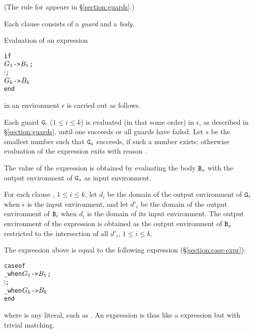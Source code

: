 \SYNTAX

\begin{rules}
       {  }

       { \OR
         \TXT{;} }

       { }

       {\TXT{->} }
\end{rules}
(The rule for  appears in \S\ref{section:guards}.)

Each clause consists of a \emph{guard} and a \emph{body}.

\EVALUATION

Evaluation of an expression
\begin{alltt}
if
    \(\Z{G}\sb{1}\) -> \(\Z{B}\sb{1}\) ;
    \(\vdots\) ;
    \(\Z{G}\sb{k}\) -> \(\Z{B}\sb{k}\)
end
\end{alltt}
in an environment $\epsilon$ is carried out as follows.

Each guard ${\tt{\sl G}}_i$ ($1\leq i\leq k$) is evaluated
(in \ifStd that \fi \ifOld some \fi order)
in $\epsilon$, as described in \S\ref{section:guards}, until one
succeeds or all guards have failed.
Let $s$ be the smallest number such that ${\tt{\sl G}}_s$
succeeds, if such a number exists; otherwise evaluation of the
 expression exits with reason .

The value of the  expression is obtained by evaluating the body
${\tt{\sl B}}_s$ with the output environment of ${\tt{\sl G}}_s$ as input
environment.

\ENVIRONMENTS

For each clause , $1\leq i\leq k$, let $d_i$
be the domain of the output environment of ${\tt{\sl G}}_i$ when $\epsilon$
is the input environment, and let $d'_i$ be the domain of the output
environment of ${\tt{\sl B}}_i$ when $d_i$ is the domain of its input
environment.  The output environment of the 
expression is obtained as the output environment of ${\tt{\sl B}}_s$
restricted to the intersection of all $d'_i$, $1\leq i\leq k$.

\NOTE

The  expression above is equal to the following
 expression (\S\ref{section:case-expr}):
\begin{alltt}
case  of
    _ when \(\Z{G}\sb{1}\) -> \(\Z{B}\sb{1}\) ;
    \(\vdots\) ;
    _ when \(\Z{G}\sb{k}\) -> \(\Z{B}\sb{k}\)
end
\end{alltt}
where  is any literal, such as .  An  expression
is thus like a  expression but with trivial matching.

